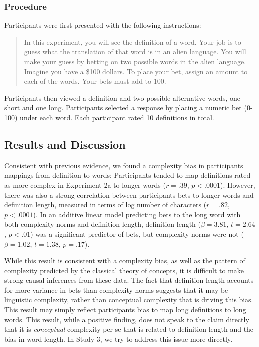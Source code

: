\subsubsection{Procedure}
Participants were first presented with the following instructions:
\begin{quote}
In this experiment, you will see the definition of a word. Your job is to guess what the translation of that word is in an alien language. You will make your guess by betting on two possible words in the alien language. Imagine you have a \$100 dollars. To place your bet, assign an amount to each of the words. Your bets must add to 100.
\end{quote}
Participants then viewed a definition and two possible alternative words, one short and one long. Participants selected a response by placing a numeric bet (0-100) under each word.  Each participant rated 10 definitions in total. 

\subsection{Results and Discussion}
Consistent with previous evidence, we found a complexity bias in participants mappings from definition to words: Participants tended to map definitions rated as more complex in Experiment 2a to longer words ($r = .39$,  $p< .0001$). However, there was also a strong correlation between participants bets to longer words and definition length, measured in terms of log number of characters ($r = .82$, $p< .0001$). In an additive linear model predicting bets to the long word with both complexity norms and definition length, definition length ($\beta=3.81$, $t =2.64$, $p<.01$) was a significant predictor of bets, but complexity norms were not ($\beta=1.02$, $t =1.38$, $p=.17$). 

While this result is consistent with a complexity bias, as well as the pattern of complexity predicted by the classical theory of concepts, it is difficult to make strong causal inferences from these data. The fact that definition length accounts for more variance in bets than complexity norms suggests that it may be linguistic complexity, rather than conceptual complexity that is driving this bias. This result may simply reflect participants bias to map long definitions to long words. This result, while a positive finding, does not speak to the claim directly that it is {\it conceptual} complexity per se that is related to definition length and the bias in word length. In Study 3, we try to address this issue more directly. 

